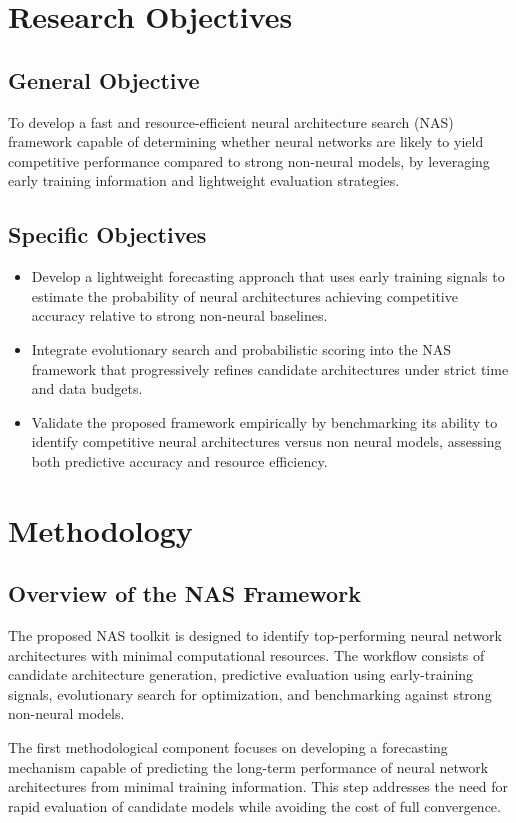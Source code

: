 \documentclass[stu,12pt,floatsintext,doublespacing]{apa7}
\begin{document}
\section{Research Objectives}
\subsection{General Objective}
To develop a fast and resource-efficient neural architecture search (NAS) framework capable of determining whether neural networks are likely to yield competitive performance compared to strong non-neural models, by leveraging early training information and lightweight evaluation strategies.

\subsection{Specific Objectives}
\begin{itemize}
    \item Develop a lightweight forecasting approach that uses early training signals to estimate the probability of neural architectures achieving competitive accuracy relative to strong non-neural baselines.
    \item Integrate evolutionary search and probabilistic scoring into the  NAS framework that progressively refines candidate architectures under strict time and data budgets.
    \item Validate the proposed framework empirically by benchmarking its ability to identify competitive neural architectures versus non neural models, assessing both predictive accuracy and resource efficiency.
    
\end{itemize}
\section{Methodology}
\subsection{Overview of the NAS Framework}
The proposed NAS toolkit is designed to identify top-performing neural network architectures with minimal computational resources. The workflow consists of candidate architecture generation, predictive evaluation using early-training signals, evolutionary search for optimization, and benchmarking against strong non-neural models.


The first methodological component focuses on developing a forecasting mechanism capable of predicting the long-term performance of neural network architectures from minimal training information. This step addresses the need for rapid evaluation of candidate models while avoiding the cost of full convergence.
\end{document}
